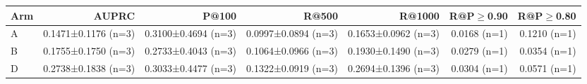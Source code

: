 \begin{tabular}{lrrrrrr}
\toprule
Arm & AUPRC & P@100 & R@500 & R@1000 & R@P$\geq$0.90 & R@P$\geq$0.80 \\
\midrule
A & 0.1471±0.1176 (n=3) & 0.3100±0.4694 (n=3) & 0.0997±0.0894 (n=3) & 0.1653±0.0962 (n=3) & 0.0168 (n=1) & 0.1210 (n=1) \\
B & 0.1755±0.1750 (n=3) & 0.2733±0.4043 (n=3) & 0.1064±0.0966 (n=3) & 0.1930±0.1490 (n=3) & 0.0279 (n=1) & 0.0354 (n=1) \\
D & 0.2738±0.1838 (n=3) & 0.3033±0.4477 (n=3) & 0.1322±0.0919 (n=3) & 0.2694±0.1396 (n=3) & 0.0304 (n=1) & 0.0571 (n=1) \\
\bottomrule
\end{tabular}
